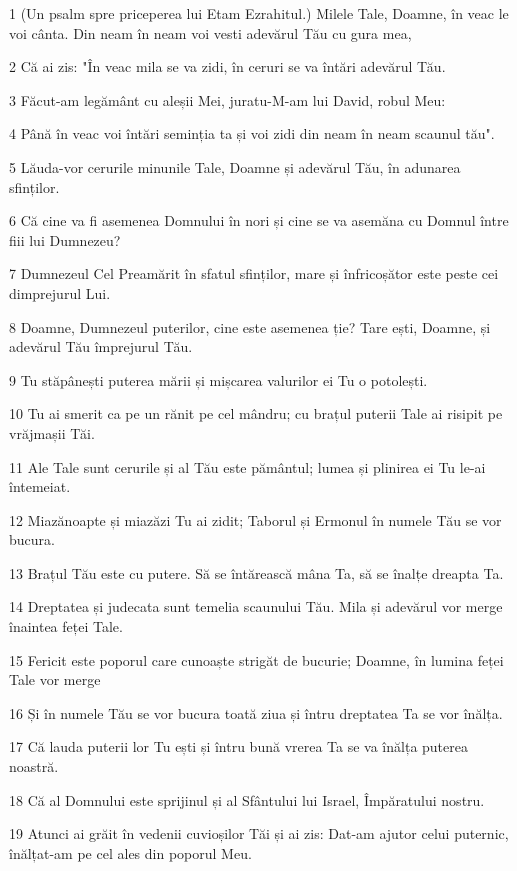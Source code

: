 \par 1 (Un psalm spre priceperea lui Etam Ezrahitul.) Milele Tale, Doamne, în veac le voi cânta. Din neam în neam voi vesti adevărul Tău cu gura mea,
\par 2 Că ai zis: "În veac mila se va zidi, în ceruri se va întări adevărul Tău.
\par 3 Făcut-am legământ cu aleșii Mei, juratu-M-am lui David, robul Meu:
\par 4 Până în veac voi întări seminția ta și voi zidi din neam în neam scaunul tău".
\par 5 Lăuda-vor cerurile minunile Tale, Doamne și adevărul Tău, în adunarea sfinților.
\par 6 Că cine va fi asemenea Domnului în nori și cine se va asemăna cu Domnul între fiii lui Dumnezeu?
\par 7 Dumnezeul Cel Preamărit în sfatul sfinților, mare și înfricoșător este peste cei dimprejurul Lui.
\par 8 Doamne, Dumnezeul puterilor, cine este asemenea ție? Tare ești, Doamne, și adevărul Tău împrejurul Tău.
\par 9 Tu stăpânești puterea mării și mișcarea valurilor ei Tu o potolești.
\par 10 Tu ai smerit ca pe un rănit pe cel mândru; cu brațul puterii Tale ai risipit pe vrăjmașii Tăi.
\par 11 Ale Tale sunt cerurile și al Tău este pământul; lumea și plinirea ei Tu le-ai întemeiat.
\par 12 Miazănoapte și miazăzi Tu ai zidit; Taborul și Ermonul în numele Tău se vor bucura.
\par 13 Brațul Tău este cu putere. Să se întărească mâna Ta, să se înalțe dreapta Ta.
\par 14 Dreptatea și judecata sunt temelia scaunului Tău. Mila și adevărul vor merge înaintea feței Tale.
\par 15 Fericit este poporul care cunoaște strigăt de bucurie; Doamne, în lumina feței Tale vor merge
\par 16 Și în numele Tău se vor bucura toată ziua și întru dreptatea Ta se vor înălța.
\par 17 Că lauda puterii lor Tu ești și întru bună vrerea Ta se va înălța puterea noastră.
\par 18 Că al Domnului este sprijinul și al Sfântului lui Israel, Împăratului nostru.
\par 19 Atunci ai grăit în vedenii cuvioșilor Tăi și ai zis: Dat-am ajutor celui puternic, înălțat-am pe cel ales din poporul Meu.
